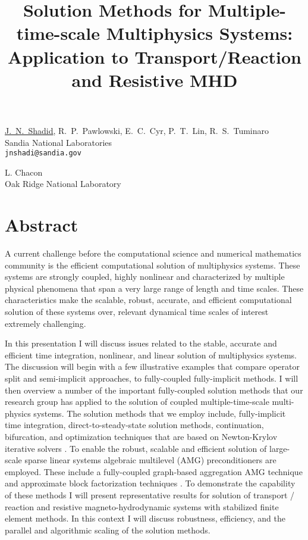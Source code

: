 \title{Solution Methods for Multiple-time-scale Multiphysics Systems: Application to Transport/Reaction and Resistive MHD}
\author{} \institute{}
\maketitle

\begin{center}
{\large \underline{J.~N.~Shadid}, R.~P.~Pawlowski, E.~C.~Cyr, P.~T.~Lin, R.~S.~Tuminaro}\\
Sandia National Laboratories\\
{\tt jnshadi@sandia.gov}\\
\vspace{4mm}

{\large L. Chacon}\\
Oak Ridge National Laboratory
\end{center}

\section*{Abstract}
A current challenge before the computational science and numerical mathematics community is the efficient computational solution of multiphysics systems.  These systems are strongly coupled, highly nonlinear and characterized by multiple physical phenomena that span a very large range of length and time scales.   These characteristics make the scalable, robust, accurate, and efficient computational solution of these systems over, relevant dynamical time scales of interest extremely challenging.

In this presentation I will discuss issues related to the stable, accurate and efficient time integration, nonlinear, and linear solution of multiphysics systems. The discussion will begin with a few illustrative examples that compare operator split and semi-implicit approaches, to fully-coupled fully-implicit methods. I will then overview a number of the important fully-coupled solution methods that our research group has applied to the solution of coupled multiple-time-scale multi-physics systems. The solution methods that we employ include, fully-implicit time integration, direct-to-steady-state solution methods, continuation, bifurcation, and optimization techniques that are based on Newton-Krylov iterative solvers \cite{heroux1,heroux2}. To enable the robust, scalable and efficient solution of large-scale sparse  linear systems algebraic multilevel (AMG) preconditioners are employed. These include a fully-coupled graph-based aggregation AMG technique \cite{heroux3} and approximate block factorization techniques \cite{heroux4}. To demonstrate the capability of these methods I will present representative results for solution of transport / reaction and resistive 
magneto-hydrodynamic systems with stabilized finite element methods. In this context I will discuss robustness, efficiency, and the parallel and algorithmic scaling of the solution methods.

